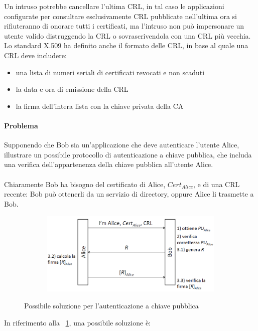 Un intruso potrebbe cancellare l'ultima CRL, in tal caso le applicazioni configurate per consultare esclusivamente CRL pubblicate nell'ultima ora si rifiuteranno di onorare tutti i certificati, ma l'intruso non può impersonare un utente valido distruggendo la CRL o sovrascrivendola con una CRL più vecchia.\\
Lo standard X.509 ha definito anche il formato delle CRL, in base al quale una CRL deve includere:
\begin{itemize}
	\item una lista di numeri seriali di certificati revocati e non scaduti
	\item la data e ora di emissione della CRL
	\item la firma dell'intera lista con la chiave privata della CA
\end{itemize}
\paragraph{Problema}
Supponendo che Bob sia un'applicazione che deve autenticare l'utente Alice, illustrare un possibile protocollo di autenticazione a chiave pubblica, che includa una verifica dell'appartenenza della chiave pubblica all'utente Alice.
\\ \\
Chiaramente Bob ha bisogno del certificato di Alice, \textit{$Cert_{Alice}$}, e di una CRL recente: Bob può ottenerli da un servizio di directory, oppure Alice li trasmette a Bob. 
\begin{figure}[htbp]
	\centering%
	\subfigure%
	{\includegraphics[height=4cm, width=12cm, keepaspectratio]{Immagini/autenticazione/ImgS76.png}}
	\caption{Possibile soluzione per l'autenticazione a chiave pubblica\label{fig:ImgS76}} 	
\end{figure}
In riferimento alla \figurename~\ref{fig:ImgS76}, una possibile soluzione è:
